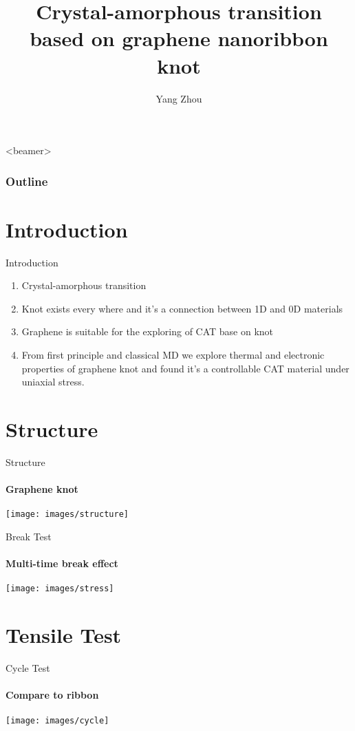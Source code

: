\documentclass{beamer}
\title{Crystal-amorphous transition based on graphene nanoribbon knot} %
\author{Yang Zhou}
\begin{document}
\frame{
\maketitle \\
{\color{white} \today}
}


\begin{frame}<beamer>
  \frametitle{Outline} %
  \tableofcontents\end{frame}
\section{Introduction}
\begin{frame}{Introduction}

  \begin{enumerate}
    \item Crystal-amorphous transition

    \item Knot exists every where and it’s a connection between 1D and 0D materials

    \item Graphene is suitable for the exploring of CAT base on knot
    \item From first principle and classical MD we explore thermal and electronic properties of graphene knot and found it’s a controllable CAT material under uniaxial  stress.

  \end{enumerate}
  \bigskip
  \justifying
\end{frame}


\section{Structure}
\begin{frame}{Structure}
  \framesubtitle{Graphene knot}%
  \texttt{[image: images/structure]}
\end{frame}

\begin{frame}{Break Test}
  \framesubtitle{Multi-time break effect}%
  \texttt{[image: images/stress]}
\end{frame}

\section{Tensile Test}
\begin{frame}{Cycle Test}
  \framesubtitle{Compare to ribbon}%
  \texttt{[image: images/cycle]}
\end{frame}
\end{document}
